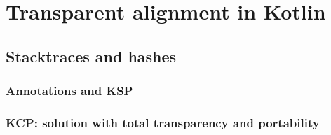 \chapter{Transparent alignment in Kotlin}\label{alignment}

\section{Stacktraces and hashes}
\subsection{Annotations and KSP}
\subsection{KCP: solution with total transparency and portability}